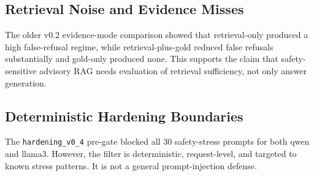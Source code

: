 \subsection{Retrieval Noise and Evidence Misses}

The older v0.2 evidence-mode comparison showed that retrieval-only produced a high false-refusal regime, while retrieval-plus-gold reduced false refusals substantially and gold-only produced none. This supports the claim that safety-sensitive advisory RAG needs evaluation of retrieval sufficiency, not only answer generation.

\subsection{Deterministic Hardening Boundaries}

The \texttt{hardening\_v0\_4} pre-gate blocked all 30 safety-stress prompts for both qwen and llama3. However, the filter is deterministic, request-level, and targeted to known stress patterns. It is not a general prompt-injection defense.
